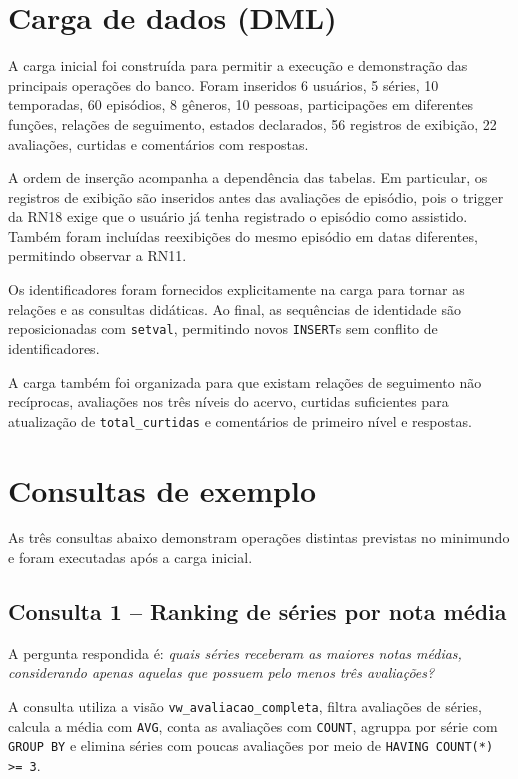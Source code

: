 \documentclass[a4paper,12pt,oneside,openany]{book}
\newcommand{\id}[1]{\texttt{#1}}
\begin{document}
\section{Carga de dados (DML)}

A carga inicial foi construída para permitir a execução e demonstração das
principais operações do banco. Foram inseridos 6 usuários, 5 séries, 10
temporadas, 60 episódios, 8 gêneros, 10 pessoas, participações em diferentes
funções, relações de seguimento, estados declarados, 56 registros de exibição,
22 avaliações, curtidas e comentários com respostas.

A ordem de inserção acompanha a dependência das tabelas. Em particular, os
registros de exibição são inseridos antes das avaliações de episódio, pois o
trigger da RN18 exige que o usuário já tenha registrado o episódio como
assistido. Também foram incluídas reexibições do mesmo episódio em datas
diferentes, permitindo observar a RN11.

Os identificadores foram fornecidos explicitamente na carga para tornar as
relações e as consultas didáticas. Ao final, as sequências de identidade são
reposicionadas com \id{setval}, permitindo novos \id{INSERT}s sem conflito de
identificadores.

A carga também foi organizada para que existam relações de seguimento
não recíprocas, avaliações nos três níveis do acervo, curtidas suficientes para
atualização de \id{total\_curtidas} e comentários de primeiro nível e respostas.

\section{Consultas de exemplo}

As três consultas abaixo demonstram operações distintas previstas no minimundo
e foram executadas após a carga inicial.

\subsection{Consulta 1 -- Ranking de séries por nota média}

A pergunta respondida é: \textit{quais séries receberam as maiores notas
médias, considerando apenas aquelas que possuem pelo menos três avaliações?}

A consulta utiliza a visão \id{vw\_avaliacao\_completa}, filtra avaliações de
séries, calcula a média com \id{AVG}, conta as avaliações com \id{COUNT},
agruppa por série com \id{GROUP BY} e elimina séries com poucas avaliações por
meio de \id{HAVING COUNT(*) >= 3}.
\end{document}
